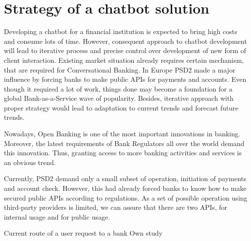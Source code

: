 
\section{Strategy of a chatbot solution}

Developing a chatbot for a financial institution is expected to bring high costs and consume lots of time.
However, consequent approach to chatbot development will lead to iterative process and precise control over development of new form of client interaction.
Existing market situation already requires certain mechanism, that are required for Conversational Banking.
In Europe PSD2 made a major influence by forcing banks to make public APIs for payments and accounts.
Even though it required a lot of work, things done may become a foundation for a global Bank-as-a-Service wave of popularity.
Besides, iterative approach with proper strategy would lead to adaptation to current trends and forecast future trends.

Nowadays, Open Banking is one of the most important innovations in banking.
Moreover, the latest requirements of Bank Regulators all over the world demand this innovation. 
Thus, granting access to more banking activities and services is an obvious trend.

Currently, PSD2 demand only a small subset of operation, initiation of payments and account check.
However, this had already forced banks to know how to make secured public APIs according to regulations.
As a set of possible operation using third-party providers is limited, we can assure that there are two APIs, for internal usage and for public usage.

\mttable
{Current route of a user request to a bank}
{Own study}
{
}

